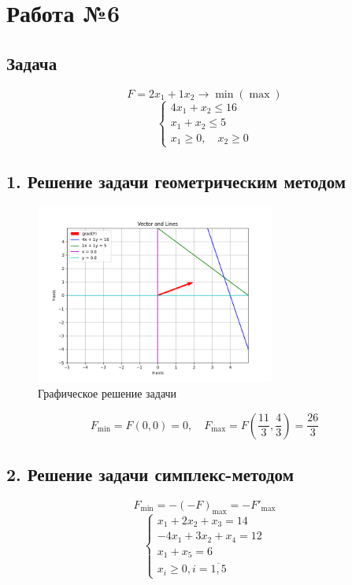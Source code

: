 \documentclass[17pt]{extarticle}
\begin{document}
\section*{Работа №6}
\subsection*{Задача}

\[
    F = 2x_1 + 1x_2 \to \min (\max)
\]
\[
    \begin{cases}
        4x_1 + x_2 \leq 16 \\
        x_1 + x_2 \leq 5   \\
        x_1 \geq 0, \quad x_2 \geq 0
    \end{cases}
\]

\subsection*{1. Решение задачи геометрическим методом}

\begin{figure}[H]
    \centering
    \includegraphics[width=0.7\textwidth]{1.png}
    \caption{Графическое решение задачи}
\end{figure}

\[
    F_{\text{min}} = F(0, 0) = 0, \quad F_{\text{max}} = F\left(\frac{11}{3}, \frac{4}{3}\right) = \frac{26}{3}
\]

\subsection*{2. Решение задачи симплекс-методом}

\[
    F_{\text{min}} = -(-F)_{\text{max}} = -F'_{\text{max}}
\]
\[
    \begin{cases}
        x_1 + 2x_2 + x_3 = 14   \\
        -4x_1 + 3x_2 + x_4 = 12 \\
        x_1 + x_5 = 6           \\
        x_i \geq 0, i=\overline{1, 5}
    \end{cases}
\]
\end{document}
